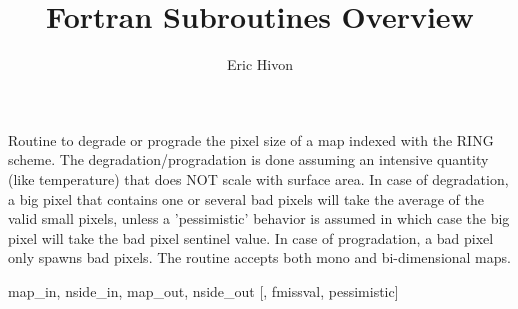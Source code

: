 
\sloppy


\title{\healpix Fortran Subroutines Overview}
 \section[udgrade\_ring*]{ }
\label{sub:udgrade_ring}
\author{Eric Hivon}


\begin{facility}
{Routine to degrade or prograde the pixel size of a \healpix map indexed with
  the RING scheme. The degradation/progradation is done assuming an
intensive quantity (like temperature) that does NOT scale with surface area. \newline
In case of degradation, a big pixel that contains one or several bad pixels will
take the average of the valid small pixels, unless a 'pessimistic' behavior
is assumed in which case the big pixel will take the bad pixel sentinel value.
In case of progradation, a bad pixel only spawns bad pixels.\newline
The routine accepts both mono and bi-dimensional maps.
}
{\modUdgradeNr}
\end{facility}

\begin{f90format}
{map\_in, nside\_in, map\_out, nside\_out [, fmissval, pessimistic]}
\end{f90format}

